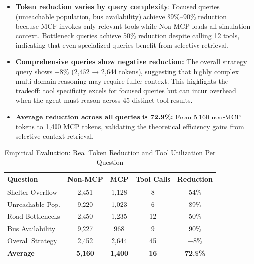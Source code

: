 \documentclass[journal]{IEEEtran}
\begin{document}
\begin{itemize}[leftmargin=*]
    \item \textbf{Token reduction varies by query complexity:} Focused queries
    (unreachable population, bus availability) achieve 89\%--90\% reduction
    because MCP invokes only relevant tools while Non-MCP loads all simulation
    context. Bottleneck queries achieve 50\% reduction despite calling 12 tools,
    indicating that even specialized queries benefit from selective retrieval.

    \item \textbf{Comprehensive queries show negative reduction:} The overall
    strategy query shows −8\% (2,452 → 2,644 tokens), suggesting that highly
    complex multi-domain reasoning may require fuller context. This highlights
    the tradeoff: tool specificity excels for focused queries but can incur
    overhead when the agent must reason across 45 distinct tool results.

    \item \textbf{Average reduction across all queries is 72.9\%:} From 5,160
    non-MCP tokens to 1,400 MCP tokens, validating the theoretical efficiency
    gains from selective context retrieval.
\end{itemize}

\begin{table}[!t]
    \centering
    \caption{Empirical Evaluation: Real Token Reduction and Tool Utilization Per Question}
    \label{tab:empirical_eval}
    \begin{tabular}{@{}p{3.5cm}cccc@{}}
        \toprule
        \textbf{Question} & \textbf{Non-MCP} & \textbf{MCP} &
        \textbf{Tool Calls} & \textbf{Reduction} \\
        \midrule
        Shelter Overflow & 2,451 & 1,128 & 8 & 54\% \\
        Unreachable Pop. & 9,220 & 1,023 & 6 & 89\% \\
        Road Bottlenecks & 2,450 & 1,235 & 12 & 50\% \\
        Bus Availability & 9,227 & 968 & 9 & 90\% \\
        Overall Strategy & 2,452 & 2,644 & 45 & −8\% \\
        \midrule
        \textbf{Average} & \textbf{5,160} & \textbf{1,400} &
        \textbf{16} & \textbf{72.9\%} \\
        \bottomrule
    \end{tabular}
\end{table}
\end{document}
